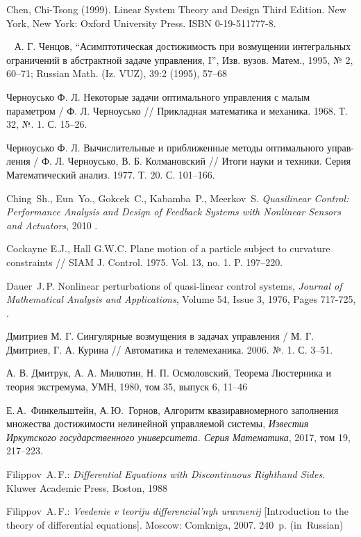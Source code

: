 \documentclass[../main.tex]{subfiles}
\begin{document}
\begin{thebibliography}{99}
Chen, Chi-Tsong (1999). Linear System Theory and Design Third Edition. New York, New York: Oxford University Press. ISBN 0-19-511777-8.

А. Г. Ченцов, “Асимптотическая достижимость при возмущении интегральных ограничений в абстрактной задаче управления, I”, Изв. вузов. Матем., 1995, № 2, 60–71; Russian Math. (Iz. VUZ), 39:2 (1995), 57–68

Черноусько Ф. Л. Некоторые задачи оптимального управления с малым параметром / Ф. Л. Черноусько // Прикладная математика и механика.  1968.  Т. 32, №. 1.  С. 15–26.

Черноусько Ф. Л. Вычислительные и приближенные методы оптимального управ-ления / Ф. Л. Черноусько, В. Б. Колмановский // Итоги науки и техники. Серия Математический анализ. 1977.  Т. 20.  С. 101–166.

Ching~Sh., Eun~Yo., Gokcek~C., Kabamba~P., Meerkov~S. \emph{Quasilinear Control: Performance Analysis and Design of Feedback Systems with Nonlinear Sensors and Actuators}, 2010 . 

Cockayne E.J., Hall G.W.C. Plane motion of a particle subject to curvature constraints // SIAM J. Control. 1975. Vol. 13, no. 1. P. 197--220.  

Dauer~J.\,P. Nonlinear perturbations of quasi-linear control systems,
\emph{Journal of Mathematical Analysis and Applications},
Volume 54, Issue 3,
1976,
Pages 717-725,
.

Дмитриев М. Г. Сингулярные возмущения в задачах управления / М. Г. Дмитриев, Г. А. Курина // Автоматика и телемеханика.  2006.  №. 1.  С. 3–51.

А. В. Дмитрук, А. А. Милютин, Н. П. Осмоловский, Теорема Люстерника и теория экстремума, УМН, 1980, том 35, выпуск 6, 11–46

Е.\,А.~Финкельштейн, А.\,Ю.~Горнов, Алгоритм квазиравномерного заполнения множества достижимости нелинейной управляемой системы, {\it Известия Иркутского государственного университета. Серия Математика}, 2017, том 19, 217–223.

Filippov~A.\,F.: \emph{Differential Equations with Discontinuous Righthand Sides}. Kluwer Academic Press, Boston, 1988

Filippov~A.\,F.: \emph{Vvedenie v teoriju differencial'nyh uravnenij} [Introduction to the theory of differential equations]. Moscow: Comkniga, 2007. 240~p. (in~Russian)


\end{thebibliography}
\end{document}
